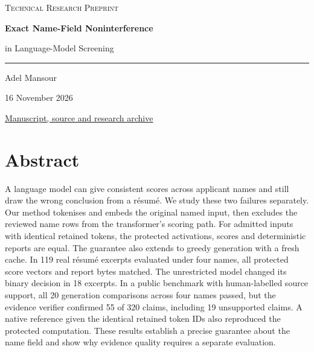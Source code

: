 \hypersetup{pageanchor=false}
\begin{titlepage}
  \centering
  \vspace*{38mm}
  {\Large\scshape Technical Research Preprint\par}
  \vspace{15mm}
  {\fontsize{25}{31}\selectfont\bfseries
    Exact Name-Field Noninterference\par
    in Language-Model Screening\par}
  \vspace{12mm}
  \rule{0.42\textwidth}{0.45pt}\par
  \vspace{10mm}
  {\Large Adel Mansour\par}
  \vspace{4mm}
  {\large 16 November 2026\par}
  \vfill
  {\small\href{https://github.com/adelmansourjr/racial-bias-ai-calibration/tree/main/nameguard-paper}{Manuscript, source and research archive}\par}
  \vspace*{12mm}
\end{titlepage}

\hypersetup{pageanchor=true}
\pagestyle{plain}
\newcommand{\frontheading}[1]{%
  \section*{#1}%
  \addcontentsline{toc}{section}{#1}}

\frontheading{Abstract}

A language model can give consistent scores across applicant names and still draw the wrong conclusion from a résumé. We study these two failures separately. Our method tokenises and embeds the original named input, then excludes the reviewed name rows from the transformer’s scoring path. For admitted inputs with identical retained tokens, the protected activations, scores and deterministic reports are equal. The guarantee also extends to greedy generation with a fresh cache. In 119 real résumé excerpts evaluated under four names, all protected score vectors and report bytes matched. The unrestricted model changed its binary decision in 18 excerpts. In a public benchmark with human-labelled source support, all 20 generation comparisons across four names passed, but the evidence verifier confirmed 55 of 320 claims, including 19 unsupported claims. A native reference given the identical retained token IDs also reproduced the protected computation. These results establish a precise guarantee about the name field and show why evidence quality requires a separate evaluation.

